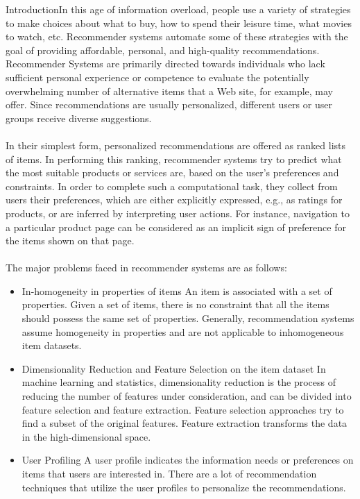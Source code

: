 \documentclass{report}
\begin{document}
\begin{projChapter}{Introduction}In this age of information overload, people use a variety of strategies to make choices about what to buy, how to spend their leisure time, what movies to watch, etc. Recommender systems automate some of these strategies with the goal of providing affordable, personal, and high-quality recommendations. Recommender Systems are primarily directed towards individuals who lack sufficient personal experience or competence to evaluate the potentially overwhelming number of alternative items that a Web site, for example, may offer. Since recommendations are usually personalized, different users or user groups receive diverse suggestions.
~\\\\
In their simplest form, personalized recommendations are offered as ranked lists of items. In performing this ranking, recommender systems try to predict what the most suitable products or services are, based on the user's preferences and constraints. In order to complete such a computational task, they collect from users their preferences, which are either explicitly expressed, e.g., as ratings for products, or are inferred by interpreting user actions. For instance, navigation to a particular product page can be considered as an implicit sign of preference for the items shown on that page.
~\\\\
The major problems faced in recommender systems are as follows:
\begin{itemize}
  \item In-homogeneity in properties of items
An item is associated with a set of properties. Given a set of items, there is no constraint that all the items should possess the same set of properties. Generally, recommendation systems assume homogeneity in properties and are not applicable to inhomogeneous item datasets.
  \item Dimensionality Reduction and Feature Selection on the item dataset
In machine learning and statistics, dimensionality reduction is the process of reducing the number of features under consideration, and can be divided into feature selection and feature extraction. Feature selection approaches try to find a subset of the original features. Feature extraction transforms the data in the high-dimensional space.
  \item User Profiling
A user profile indicates the information needs or preferences on items that users are interested in. There are a lot of recommendation techniques that utilize the user profiles to personalize the recommendations.

\end{itemize}
\end{projChapter}
\end{document}
